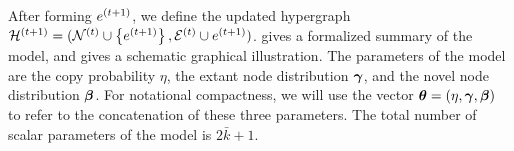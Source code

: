 After forming $e^{(t+1)}$, we define the updated hypergraph $\mathcal{H}^{(t+1)} = (\mathcal{N}^{(t)} \cup \left\{e^{(t+1)}\right\}, \mathcal{E}^{(t)} \cup {e^{(t+1)}})$. 
 gives a formalized summary of the model, and  gives a schematic graphical illustration. 
The parameters of the model are the copy probability $\eta$, the extant node distribution $\boldsymbol{\gamma}$, and the novel node distribution $\boldsymbol{\beta}$. 
For notational compactness, we will use the vector $\boldsymbol{\theta} = (\eta, \boldsymbol{\gamma}, \boldsymbol{\beta})$ to refer to the concatenation of these three parameters. 
The total number of scalar parameters of the model is $2\bar{k} + 1$. 





